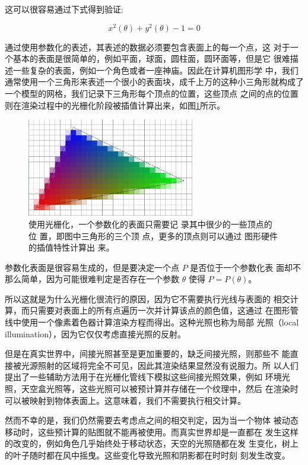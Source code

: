 \noindent 这可以很容易通过下式得到验证:

\begin{equation}
	x^{2}(\theta)+y^{2}(\theta)-1=0
\end{equation}

通过使用参数化的表述，其表述的数据必须要包含表面上的每一个点，这 对于一个基本的表面是很简单的，例如平面，球面，圆柱面，圆环面等，但是它 很难描述一些复杂的表面，例如一个角色或者一座神庙。因此在计算机图形学 中，我们通常使用一个三角形来表述一个很小的表面块，成千上万的这种小三角形就构成了一个模型的网格，我们记录下三角形每个顶点的位置，这些顶点 之间的点的位置则在渲染过程中的光栅化阶段被插值计算出来，如图\ref{f:df-rasterization}所示。

\begin{figure}
	\sidecaption
	\includegraphics[width=0.65\textwidth]{figures/df/rasterization}
	\caption{使用光栅化，一个参数化的表面只需要记 录其中很少的一些顶点的位 置，即图中三角形的三个顶 点，更多的顶点则可以通过 图形硬件的插值特性计算出 来。}
	\label{f:df-rasterization}
\end{figure}

参数化表面是很容易生成的，但是要决定一个点 $P$ 是否位于一个参数化表 面却不那么简单，因为可能很难判定是否存在一个参数 $\theta$ 使得 $P = P (\theta)$。

所以这就是为什么光栅化很流行的原因，因为它不需要执行光线与表面的 相交计算，而只需要对表面上的所有点遍历一次并计算该点的颜色值，这通过 在图形管线中使用一个像素着色器计算渲染方程而得出。这种光照也称为局部 光照（local illumination），因为它仅仅考虑直接光照的反射。

但是在真实世界中，间接光照甚至是更加重要的，缺乏间接光照，则那些不 能直接被光源照射的区域将完全不可见，因此其渲染结果显然没有说服力。所 以人们提出了一些辅助方法用于在光栅化管线下模拟这些间接光照效果，例如 环境光照，天空盒光照等，这些光照可以被预计算并存储在一个纹理中，然后 在渲染时可以被映射到物体表面上。这意味着，我们不需要执行相交计算。

然而不幸的是，我们仍然需要去考虑点之间的相交判定，因为当一个物体 被动态移动时，这些预计算的贴图就不能再被使用。而真实世界却是一直都在 发生这样的改变的，例如角色几乎始终处于移动状态，天空的光照随都在发 生变化，树上的叶子随时都在风中摇曳。这些变化导致光照和阴影都在时时刻 刻发生改变。

